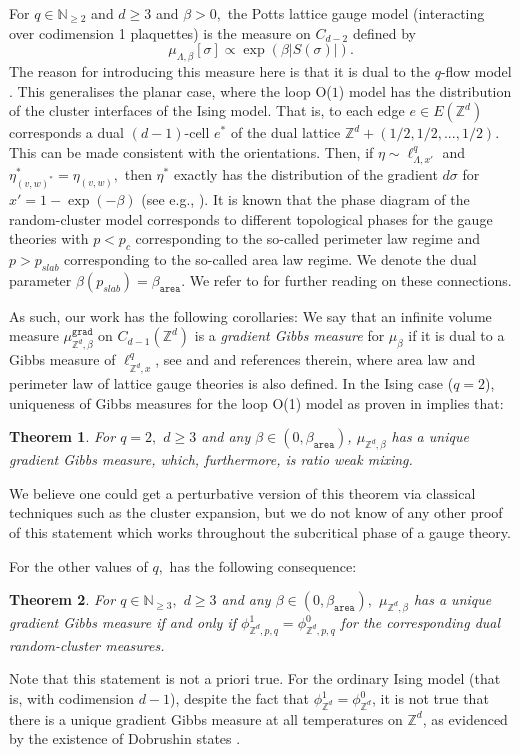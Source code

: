 \documentclass[article,11pt,reqno]{amsart}
\newcommand{\Z}{\mathbb{Z}}
\newtheorem{theorem}{Theorem}[section]
\begin{document}
For $q\in \mathbb{N}_{\geq 2}$ and $d\geq 3$ and $\beta>0,$ the Potts lattice gauge model (interacting over codimension 1 plaquettes) is the measure on $C_{d-2}$ defined by
$$
\mu_{\Lambda,\beta}[\sigma]\propto \exp(\beta |S(\sigma)|).
$$
The reason for introducing this measure here is that it is dual to the $q$-flow model \cite{WegDual}. This generalises the planar case, where the loop O($1$) model has the distribution of the cluster interfaces of the Ising model. That is, to each edge $e\in E(\mathbb{Z}^d)$ corresponds a dual $(d-1)$-cell $e^*$ of the dual lattice $\mathbb{Z}^d+(1/2,1/2,...,1/2)$. This can be made consistent with the orientations. Then, if $\eta\sim \ell^q_{\Lambda,x'}$ and $\eta^*_{(v,w)^*}=\eta_{(v,w)},$ then $\eta^*$ exactly has the distribution of the gradient $d\sigma$ for $x'=1-\exp(-\beta)$ (see e.g., \cite[Section D.1]{hansen2025general}). 
 It is known that the phase diagram of the random-cluster model corresponds to different topological phases for the gauge theories with $p<p_c$ corresponding to the so-called perimeter law regime and $p>p_{slab}$ corresponding to the so-called area law regime. We denote the dual parameter $\beta(p_{slab})=\beta_{\mathtt{area}}.$ We refer to \cite{AllTheAuthors, duncanPRCM2} for further reading on these connections.

As such, our work has the following corollaries: We say that an infinite volume measure $\mu^{\mathtt{grad}}_{\mathbb{Z}^d,\beta}$ on $C_{d-1}(\mathbb{Z}^d)$ is a \emph{gradient Gibbs measure} for $\mu_{\beta}$ if it is dual to a Gibbs measure of $\ell^{q}_{\mathbb{Z}^d,x}$, see \cite{duncanPRCM2,lebowitz1981surface} and \cite[Theorem 9.1]{aizenman2025geometric} and references therein, where area law and perimeter law of lattice gauge theories is also defined. In the Ising case ($q=2$), uniqueness of Gibbs measures for the loop O(1) model as proven in  implies that:
\begin{theorem}
For $q=2,$ $d\geq 3$ and any $\beta\in(0,\beta_{\mathtt{area}})$, $\mu_{\Z^d,\beta}$ has a unique gradient Gibbs measure, which, furthermore, is ratio weak mixing.
\end{theorem}
We believe one could get a perturbative version of this theorem via classical techniques such as the cluster expansion, but we do not know of any other proof of this statement which works throughout the subcritical phase of a gauge theory.


For the other values of $q,$   has the following consequence:
\begin{theorem}
    For $q\in \mathbb{N}_{\geq 3},$ $d\geq 3$ and any $\beta\in (0,\beta_{\mathtt{area}}),$ $\mu_{\Z^d,\beta}$ has a unique gradient Gibbs measure if and only if $\phi^1_{\mathbb{Z}^d,p,q}=\phi^0_{\mathbb{Z}^d,p,q}$ for the corresponding dual random-cluster measures.
\end{theorem}
Note that this statement is not a priori true. For the ordinary Ising model (that is, with codimension $d-1$), despite the fact that $\phi_{\Z^d}^1=\phi_{\Z^d}^0$, it is not true that there is a unique gradient Gibbs measure at all temperatures on $\mathbb{Z}^d$, as evidenced by the existence of Dobrushin states \cite{DobrushinStates}. 
\end{document}
